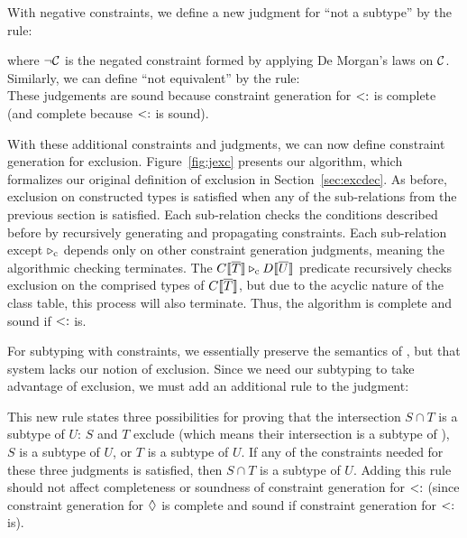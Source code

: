 With negative constraints, we define a new judgment for ``not a subtype'' by the rule:\\[-1.5em]
\infrule
  {}
  {}

\noindent where $\neg\mathcal{C}$ is the negated constraint formed by applying De Morgan's laws on $\mathcal{C}$. Similarly, we can define ``not equivalent'' by the rule:\\[-1em]
\infrule
  {}
  {}
These judgements are sound because constraint generation for $<:$ is complete (and complete because $<:$ is sound).




With these additional constraints and judgments, we can now define
constraint generation for exclusion.
Figure~\ref{fig:jexc} presents our algorithm, which
formalizes our original definition of exclusion in
Section~\ref{sec:excdec}.
As before, exclusion on constructed types is
satisfied when any of the sub-relations from the previous section is
satisfied. Each sub-relation checks the conditions described before
by recursively generating and propagating constraints. Each
sub-relation except $\triangleright_\textrm{c}$ depends only on other constraint
generation judgments, meaning the algorithmic checking
terminates. The $C\llbracket \overline{T} \rrbracket \triangleright_\textrm{c} D\llbracket \overline{U} \rrbracket$ predicate recursively
checks exclusion on the comprised types of $C\llbracket \overline{T} \rrbracket$, but due to
the acyclic nature of the class table, this process will also terminate. 
Thus, the algorithm is complete and sound if $<:$ is.


For subtyping with constraints, we essentially preserve the semantics
of \cite{smith08}, but that system lacks our notion of
exclusion. Since we need our subtyping to take advantage of
exclusion, we must add an additional rule to the judgment:\\[-1em] 

\infrule
  { \andalso
    \andalso{}}
  {}

\noindent This new rule states three possibilities for proving that the intersection $S \cap T$ is a subtype of $U$: $S$ and $T$ exclude (which means their intersection is a subtype of \BottomType), $S$ is a subtype of $U$, or $T$ is a subtype of $U$. If any of the constraints needed for these three judgments is satisfied, then $S \cap T$ is a subtype of $U$. Adding this rule should not affect completeness or soundness of constraint generation for $<:$ (since constraint generation for $\mathrel{\lozenge}$ is complete and sound if constraint generation for $<:$ is).

